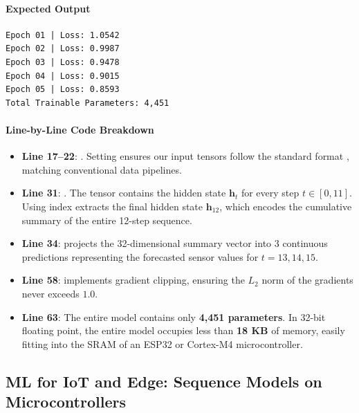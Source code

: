 \paragraph{Expected Output}
\begin{lstlisting}[style=outputstyle]
Epoch 01 | Loss: 1.0542
Epoch 02 | Loss: 0.9987
Epoch 03 | Loss: 0.9478
Epoch 04 | Loss: 0.9015
Epoch 05 | Loss: 0.8593
Total Trainable Parameters: 4,451
\end{lstlisting}

\paragraph{Line-by-Line Code Breakdown}
\begin{itemize}
    \item \textbf{Line 17--22}: . Setting  ensures our input tensors follow the standard format , matching conventional data pipelines.
    \item \textbf{Line 31}: . The tensor  contains the hidden state $\mathbf{h}_t$ for every step $t \in [0, 11]$. Using index  extracts the final hidden state $\mathbf{h}_{12}$, which encodes the cumulative summary of the entire 12-step sequence.
    \item \textbf{Line 34}:  projects the 32-dimensional summary vector into 3 continuous predictions representing the forecasted sensor values for $t=13, 14, 15$.
    \item \textbf{Line 58}:  implements gradient clipping, ensuring the $L_2$ norm of the gradients never exceeds $1.0$.
    \item \textbf{Line 63}: The entire model contains only \textbf{4,451 parameters}. In 32-bit floating point, the entire model occupies less than \textbf{18 KB} of memory, easily fitting into the SRAM of an ESP32 or Cortex-M4 microcontroller.
\end{itemize}

\subsection{ML for IoT and Edge: Sequence Models on Microcontrollers}\label{subsec:iot_sequence}

